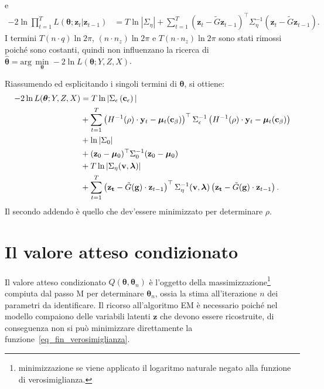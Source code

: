 e
\begin{equation}
	\begin{split}
		- 2\ln\prod_{t=1}^{T} L(\boldsymbol{\theta}; \mathbf{z}_t|\mathbf{z}_{t-1}) & = T\ln|\Sigma_\eta| +\sum_{t=1}^{T} \left(\mathbf{z}_t - \tilde{G}\mathbf{z}_{t-1} \right)^\top\Sigma_\eta^{-1}\left(\mathbf{z}_t - \tilde{G}\mathbf{z}_{t-1} \right).
	\end{split}
\end{equation}
I termini $T(n\cdot q)\ln 2\pi$, $(n\cdot n_z)\ln 2\pi$ e $T(n\cdot n_z)\ln 2\pi$ sono stati rimossi poiché sono costanti, quindi non influenzano la ricerca di $\hat{\boldsymbol{\theta}}=\text{arg}\,\min\limits_{\boldsymbol{\theta}} -2\ln L(\boldsymbol{\theta}; Y, Z, X)$. \par Riassumendo ed esplicitando i singoli termini di $\boldsymbol{\theta}$, si ottiene:
\begin{equation}
	\begin{split}
		-2\ln L(\boldsymbol{\theta}; Y, Z, X) & =  T\ln|\Sigma_\epsilon\left(\textcolor{black}{\mathbf{c}_\epsilon}\right)| \\
		& + \sum_{t=1}^{T} \left(H^{-1}(\textcolor{black}{\rho})\cdot\mathbf{y}_t - \boldsymbol{\mu}_t(\textcolor{black}{\mathbf{c}_\beta})\right)^\top\Sigma_\epsilon^{-1}\left(H^{-1}(\textcolor{black}{\rho})\cdot\mathbf{y}_t - \boldsymbol{\mu}_t(\textcolor{black}{\mathbf{c}_\beta})\right) \\
		& + \ln|\Sigma_0| \\
		& + (\mathbf{z}_0 - \boldsymbol{\mu}_0)^\top\Sigma_0^{-1}(\mathbf{z}_0 - \boldsymbol{\mu}_0) \\
		& + T\ln |\Sigma_\eta(\textcolor{black}{\mathbf{v},\boldsymbol{\lambda}})| \\
		& + \sum_{t=1}^{T}\left(\mathbf{z_t}-\tilde{G}(\textcolor{black}{\mathbf{g}})\cdot\mathbf{z}_{t-1}\right)^\top\Sigma_\eta^{-1}(\textcolor{black}{\mathbf{v},\boldsymbol{\lambda}})\left(\mathbf{z_t}-\tilde{G}(\textcolor{black}{\mathbf{g}})\cdot\mathbf{z}_{t-1}\right).
	\end{split}
	\label{eq_fin_verosimiglianza}
\end{equation}
Il secondo addendo è quello che dev'essere minimizzato per determinare $\rho$.

\section[Il valore atteso condizionato]{Il valore atteso condizionato}
Il valore atteso condizionato $Q(\boldsymbol{\theta}, \boldsymbol{\theta}_n)$ è l'oggetto della massimizzazione\footnote{minimizzazione se viene applicato il logaritmo naturale negato alla funzione di verosimiglianza.} compiuta dal passo M per determinare $\boldsymbol{\theta}_n$, ossia la stima all'iterazione $n$ dei parametri da identificare. Il ricorso all'algoritmo EM è necessario poiché nel modello compaiono delle variabili latenti $\mathbf{z}$ che devono essere ricostruite, di conseguenza non si può minimizzare direttamente la funzione~\ref{eq_fin_verosimiglianza}.

